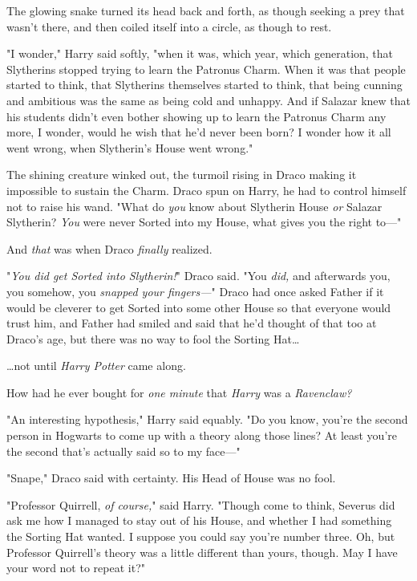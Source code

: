 The glowing snake turned its head back and forth, as though seeking a prey that
wasn’t there, and then coiled itself into a circle, as though to rest.

"I wonder," Harry said softly, "when it was, which year, which generation, that
Slytherins stopped trying to learn the Patronus Charm. When it was that people
started to think, that Slytherins themselves started to think, that being
cunning and ambitious was the same as being cold and unhappy. And if Salazar
knew that his students didn’t even bother showing up to learn the Patronus
Charm any more, I wonder, would he wish that he’d never been born? I wonder how
it all went wrong, when Slytherin’s House went wrong."

The shining creature winked out, the turmoil rising in Draco making it
impossible to sustain the Charm. Draco spun on Harry, he had to control himself
not to raise his wand. "What do \emph{you} know about Slytherin House \emph{or}
Salazar Slytherin? \emph{You} were never Sorted into my House, what gives you
the right to—"

And \emph{that} was when Draco \emph{finally} realized.

"\emph{You did get Sorted into Slytherin!}" Draco said. "You \emph{did,} and
afterwards you, you somehow, you \emph{snapped your fingers—}" Draco had once
asked Father if it would be cleverer to get Sorted into some other House so
that everyone would trust him, and Father had smiled and said that he’d thought
of that too at Draco’s age, but there was no way to fool the Sorting Hat…

…not until \emph{Harry Potter} came along.

How had he ever bought for \emph{one minute} that \emph{Harry} was a
\emph{Ravenclaw?}

"An interesting hypothesis," Harry said equably. "Do you know, you’re the
second person in Hogwarts to come up with a theory along those lines? At least
you’re the second that’s actually said so to my face—"

"Snape," Draco said with certainty. His Head of House was no fool.

"Professor Quirrell, \emph{of course,}" said Harry. "Though come to think,
Severus did ask me how I managed to stay out of his House, and whether I had
something the Sorting Hat wanted. I suppose you could say you’re number three.
Oh, but Professor Quirrell’s theory was a little different than yours, though.
May I have your word not to repeat it?"

